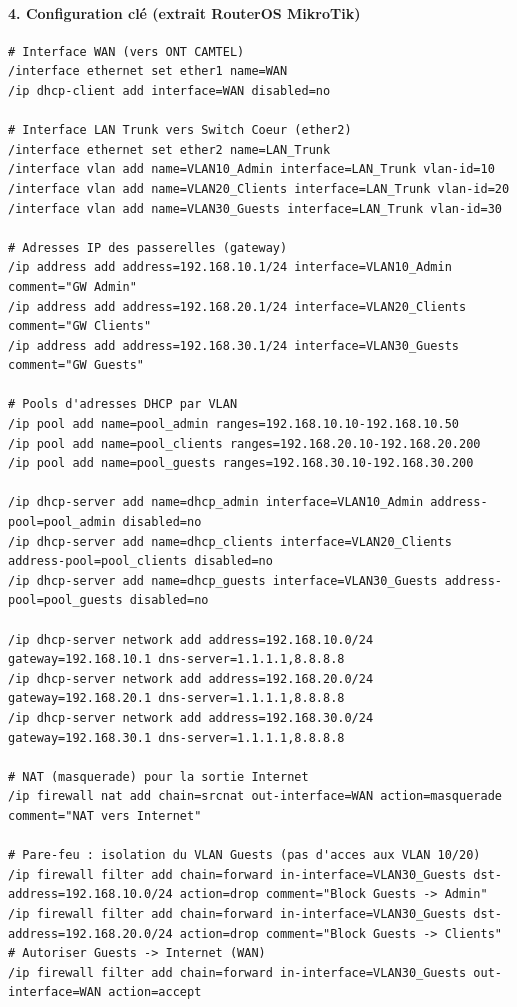 \documentclass[11pt]{article}
\begin{document}
\begin{exoresolu}
\paragraph{4. Configuration clé (extrait RouterOS MikroTik)}
\begin{lstlisting}
# Interface WAN (vers ONT CAMTEL)
/interface ethernet set ether1 name=WAN
/ip dhcp-client add interface=WAN disabled=no

# Interface LAN Trunk vers Switch Coeur (ether2)
/interface ethernet set ether2 name=LAN_Trunk
/interface vlan add name=VLAN10_Admin interface=LAN_Trunk vlan-id=10
/interface vlan add name=VLAN20_Clients interface=LAN_Trunk vlan-id=20
/interface vlan add name=VLAN30_Guests interface=LAN_Trunk vlan-id=30

# Adresses IP des passerelles (gateway)
/ip address add address=192.168.10.1/24 interface=VLAN10_Admin comment="GW Admin"
/ip address add address=192.168.20.1/24 interface=VLAN20_Clients comment="GW Clients"
/ip address add address=192.168.30.1/24 interface=VLAN30_Guests comment="GW Guests"

# Pools d'adresses DHCP par VLAN
/ip pool add name=pool_admin ranges=192.168.10.10-192.168.10.50
/ip pool add name=pool_clients ranges=192.168.20.10-192.168.20.200
/ip pool add name=pool_guests ranges=192.168.30.10-192.168.30.200

/ip dhcp-server add name=dhcp_admin interface=VLAN10_Admin address-pool=pool_admin disabled=no
/ip dhcp-server add name=dhcp_clients interface=VLAN20_Clients address-pool=pool_clients disabled=no
/ip dhcp-server add name=dhcp_guests interface=VLAN30_Guests address-pool=pool_guests disabled=no

/ip dhcp-server network add address=192.168.10.0/24 gateway=192.168.10.1 dns-server=1.1.1.1,8.8.8.8
/ip dhcp-server network add address=192.168.20.0/24 gateway=192.168.20.1 dns-server=1.1.1.1,8.8.8.8
/ip dhcp-server network add address=192.168.30.0/24 gateway=192.168.30.1 dns-server=1.1.1.1,8.8.8.8

# NAT (masquerade) pour la sortie Internet
/ip firewall nat add chain=srcnat out-interface=WAN action=masquerade comment="NAT vers Internet"

# Pare-feu : isolation du VLAN Guests (pas d'acces aux VLAN 10/20)
/ip firewall filter add chain=forward in-interface=VLAN30_Guests dst-address=192.168.10.0/24 action=drop comment="Block Guests -> Admin"
/ip firewall filter add chain=forward in-interface=VLAN30_Guests dst-address=192.168.20.0/24 action=drop comment="Block Guests -> Clients"
# Autoriser Guests -> Internet (WAN)
/ip firewall filter add chain=forward in-interface=VLAN30_Guests out-interface=WAN action=accept
\end{lstlisting}


\end{exoresolu}
\end{document}

